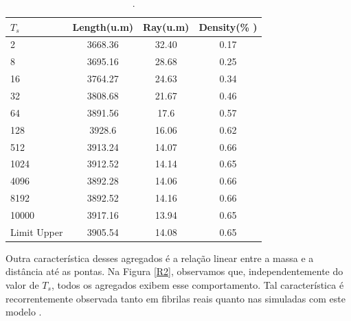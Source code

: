 \documentclass{article}
\begin{document}
\begin{table}[H]
    \caption{.}

    \centering  %
    \begin{tabular}{lccc}
    \hline
    \textbf{$T_{s}$} & \multicolumn{1}{c}{\textbf{Length(u.m)}} & \textbf{Ray(u.m)} & \textbf{Density(\% )} \\ \hline
    2                & 3668.36                                   & 32.40             & 0.17                  \\
    8                & 3695.16                                   & 28.68             & 0.25                  \\
    16               & 3764.27                                   & 24.63             & 0.34                  \\
    32               & 3808.68                                   & 21.67             & 0.46                  \\
    64               & 3891.56                                   & 17.6              & 0.57                  \\
    128              & 3928.6                                    & 16.06             & 0.62                  \\
    512              & 3913.24                                   & 14.07             & 0.66                  \\
    1024             & 3912.52                                   & 14.14             & 0.65                  \\
    4096             & 3892.28                                   & 14.06             & 0.66                  \\
    8192             & 3892.52                                   & 14.16             & 0.66                  \\
    10000            & 3917.16                                   & 13.94             & 0.65                  \\ \hline
    \multicolumn{1}{l}{Limit Upper} & 3905.54                    & 14.08             & 0.65                  \\ \hline
    \end{tabular}
    \label{tab1}  %
\end{table}


Outra característica desses agregados é a relação linear entre a massa e a distância até as pontas. Na Figura 
\ref{R2}, observamos que, independentemente do valor de \(T_{s}\), todos os agregados exibem esse comportamento. 
Tal característica é recorrentemente observada tanto em fibrilas reais quanto nas simuladas com este modelo 
\cite{Parkinson1995,Kadler1987}. 
\end{document}
